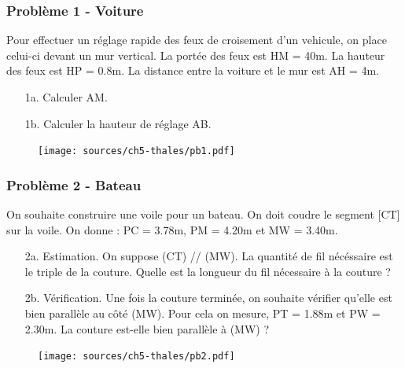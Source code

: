 \documentclass[11pt]{article}
\begin{document}
\begin{multicols}{2}

\subsubsection*{Problème 1 - Voiture}

Pour effectuer un réglage rapide des feux de croisement d'un vehicule, on place celui-ci devant un mur vertical. La portée des feux est HM = 40m. La hauteur des feux est HP = 0.8m. La distance entre la voiture et le mur est AH = 4m.

\begin{enumerate}
  \item[1a.] Calculer AM.
  \item[1b.] Calculer la hauteur de réglage AB.
\end{enumerate}

\begin{figure}[H]
  \centering
  \texttt{[image: sources/ch5-thales/pb1.pdf]}
\end{figure}

\end{multicols}

\begin{multicols}{2}

\subsubsection*{Problème 2 - Bateau}

On souhaite construire une voile pour un bateau. On doit coudre le segment [CT] sur la voile. On donne : PC = 3.78m, PM = 4.20m et MW = 3.40m.

\begin{enumerate}
  \item[2a.] Estimation. On suppose (CT) // (MW). La quantité de fil nécéssaire est le triple de la couture. Quelle est la longueur du fil nécessaire à la couture ?

  \item[2b.] Vérification. Une fois la couture terminée, on souhaite vérifier qu'elle est bien parallèle au côté (MW). Pour cela on mesure, PT = 1.88m et PW = 2.30m.
  La couture est-elle bien parallèle à (MW) ?
\end{enumerate}

\begin{figure}[H]
  \centering
  \texttt{[image: sources/ch5-thales/pb2.pdf]}
\end{figure}

\end{multicols}
\end{document}
